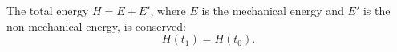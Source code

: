 The total energy $H = E + E'$, where $E$ is the mechanical energy and $E'$ is the non-mechanical energy, is conserved:
$$H(t_1) = H(t_0).$$
